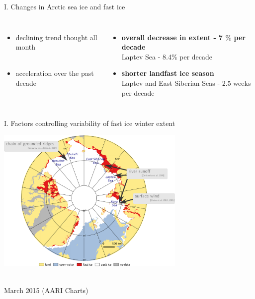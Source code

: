 \documentclass[8pt]{beamer}
\newcommand\Fontvi{\fontsize{6}{7.2}\selectfont}
\begin{document}
\begin{frame}[fragile]{I. Changes in Arctic sea ice and fast ice}
\begin{columns}
			
	\end{columns}
	
	\begin{columns}
			\begin{itemize}
				\item declining trend thought all month\\~\\
				\item acceleration over the past decade
			\end{itemize}
	\begin{itemize}
	\item \textbf{overall decrease in extent - 7 $\%$ per decade}\\
	Laptev Sea - 8.4$\%$ per decade

	\item \textbf{shorter landfast ice season\\}
	 Laptev and East Siberian Seas - 2.5 weeks per decade
	 \end{itemize}
	 \end{columns}

\end{frame}

\setwatermark{\fontsize{125pt}{125pt}\selectfont{}}
\begin{frame}[fragile]{I. Factors controlling variability of fast ice winter extent}
	\begin{center}
		\includegraphics[height=7cm]{./img/ArcticSI_Mar2015_FI_know.pdf}\\
	\end{center}
	~\\
	\Fontvi
	17 March 2015 (AARI Charts)
\end{frame}
\end{document}
